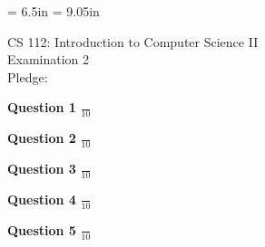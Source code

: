 \textwidth = 6.5in
\textheight = 9.05in
\topmargin 0.0in
\oddsidemargin 0.0in
\evensidemargin 0.0in


\setcounter{secnumdepth}{3}
\setcounter{tocdepth}{3}

        
\def\widow#1{\vskip #1\vbadness10000\penalty-200\vskip-#1}


\def\littlesection#1{
\widow{2cm}
\vskip 0.5cm
\noindent{\bf #1}
\vskip 0.1cm
\noindent
}


\newdimen\tmpdim
\long{}

\renewcommand{\baselinestretch}{1.2}    %
\newtheorem{principle}{Principle}
\newtheorem{definition}{Definition}
\newtheorem{define}{Definition}



\vspace*{3in}

\begin{center}

CS 112: Introduction to Computer Science II \\
Examination 2 \\
Pledge: \\

\end{center}

\newpage

\Large

{\bf Question 1} \hspace*{.2in} \Large{$\frac{}{10}$}

\newpage

{\bf Question 2} \hspace*{.2in} \Large{$\frac{}{10}$}

\newpage

{\bf Question 3} \hspace*{.2in} \Large{$\frac{}{10}$}

\newpage

{\bf Question 4} \hspace*{.2in} \Large{$\frac{}{10}$}

\newpage

{\bf Question 5} \hspace*{.2in} \Large{$\frac{}{10}$}

\newpage


